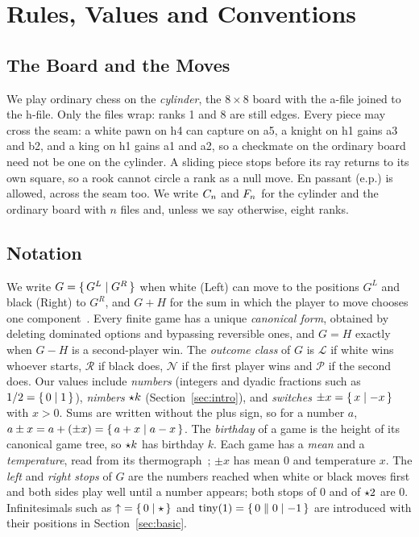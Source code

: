 \section{Rules, Values and Conventions}\label{sec:rules}

\subsection{The Board and the Moves}
We play ordinary chess on the \emph{cylinder}, the $8\times8$ board with the a-file joined to the h-file. Only
the files wrap: ranks 1 and 8 are still edges. Every piece may cross the seam: a white pawn on h4 can capture on
a5, a knight on h1 gains a3 and b2, and a king on h1 gains a1 and a2, so a checkmate on the ordinary board need
not be one on the cylinder. A sliding piece stops before its ray returns to its own square, so a rook cannot
circle a rank as a null move. En passant (e.p.) is allowed, across the seam too. We write $C_{n}$ and
$F_{n}$ for the cylinder and the ordinary board with $n$ files and, unless we say otherwise, eight ranks.

\subsection{Notation}\label{sec:notation}
We write $G=\{\,G^L \mid G^R\,\}$ when white (Left) can move to the positions $G^L$ and black (Right) to $G^R$, and
$G+H$ for the sum in which the player to move chooses one component~\cite{WinningWays,ONAG,Siegel2013}. Every
finite game has a unique \emph{canonical form}, obtained by deleting dominated options and bypassing reversible
ones, and $G=H$ exactly when $G-H$ is a second-player win. The \emph{outcome class} of $G$ is $\mathcal{L}$ if
white wins whoever starts, $\mathcal{R}$ if black does, $\mathcal{N}$ if the first player wins and
$\mathcal{P}$ if the second does. Our values include \emph{numbers} (integers and dyadic fractions such as
$1/2=\{\,0 \mid 1\,\}$), \emph{nimbers} $\mathord{\star k}$ (Section~\ref{sec:intro}), and \emph{switches} $\pm x=\{\,x \mid -x\,\}$ with $x>0$. Sums are written without the plus sign,
so for a number $a$, $a\pm x=a+(\pm x)=\{\,a+x \mid a-x\,\}$. The \emph{birthday} of a game is the height of its
canonical game tree, so $\mathord{\star k}$ has birthday $k$. Each game has a \emph{mean} and a \emph{temperature}, read
from its thermograph~\cite{WinningWays}; $\pm x$ has mean $0$ and temperature $x$. The \emph{left} and
\emph{right stops} of $G$ are the numbers reached when white or black moves first and both sides play well until a
number appears; both stops of $0$ and of $\mathord{\star2}$ are $0$. Infinitesimals such as ${\uparrow}=\{\,0 \mid \star\,\}$ and
$\operatorname{tiny}(1)=\{\,0 \parallel 0\mid -1\,\}$ are introduced with their positions in Section~\ref{sec:basic}.

